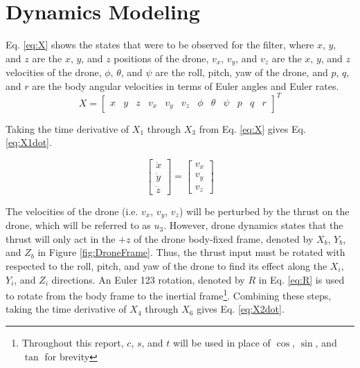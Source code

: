\documentclass[letterpaper, paper,11pt]{AAS}	%
\begin{document}
\section{Dynamics Modeling}

Eq. \eqref{eq:X} shows the states that were to be observed for the filter, where $x$, $y$, and $z$ are the $x$, $y$, and $z$ positions of the drone, $v_x$, $v_y$, and $v_z$ are the $x$, $y$, and $z$ velocities of the drone, $\phi$, $\theta$, and $\psi$ are the roll, pitch, yaw of the drone, and $p$, $q$, and $r$ are the body angular velocities in terms of Euler angles and Euler rates. 
\setcounter{MaxMatrixCols}{12}
\begin{equation}
	\label{eq:X}
	X = \begin{bmatrix}
		x & y & z & v_x & v_y & v_z & \phi & \theta & \psi & p & q & r
\end{bmatrix}^T
\end{equation}

Taking the time derivative of $X_1$ through $X_3$ from Eq. \eqref{eq:X} gives Eq. \eqref{eq:X1dot}.

\begin{equation}
\begin{bmatrix}
\dot{x}\\
\dot{y}\\
\dot{z}
\end{bmatrix} =
\begin{bmatrix}
v_x \\
v_y\\
v_z
\end{bmatrix}
\label{eq:X1dot}
\end{equation}

The velocities of the drone (i.e. $v_x$, $v_y$, $v_z$) will be perturbed by the thrust on the drone, which will be referred to as $u_3$. However, drone dynamics states that the thrust will only act in the $+z$ of the drone body-fixed frame, denoted by $X_b$, $Y_b$, and $Z_b$ in Figure \ref{fig:DroneFrame}. Thus, the thrust input must be rotated with respected to the roll, pitch, and yaw of the drone to find its effect along the $X_i$, $Y_i$, and $Z_i$ directions. An Euler 123 rotation, denoted by $R$ in Eq. \eqref{eq:R} is used to rotate from the body frame to the inertial frame\footnote{Throughout this report, $c$, $s$, and $t$ will be used in place of $\cos$, $\sin$, and $\tan$ for brevity}. Combining these steps, taking the time derivative of $X_4$ through $X_6$ gives Eq. \eqref{eq:X2dot}.
\end{document}
